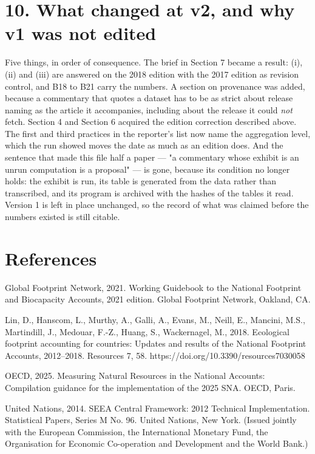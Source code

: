 \documentclass[11pt]{article}
\begin{document}
\section*{10. What changed at v2, and why v1 was not edited}\label{10-what-changed-at-v2-and-why-v1-was-not-edited}

Five things, in order of consequence. The brief in Section 7 became a result: (i), (ii) and (iii) are answered on the 2018 edition with the 2017 edition as revision control, and B18 to B21 carry the numbers. A section on provenance was added, because a commentary that quotes a dataset has to be as strict about release naming as the article it accompanies, including about the release it could \emph{not} fetch. Section 4 and Section 6 acquired the edition correction described above. The first and third practices in the reporter's list now name the aggregation level, which the run showed moves the date as much as an edition does. And the sentence that made this file half a paper --- "a commentary whose exhibit is an unrun computation is a proposal" --- is gone, because its condition no longer holds: the exhibit is run, its table is generated from the data rather than transcribed, and its program is archived with the hashes of the tables it read. Version 1 is left in place unchanged, so the record of what was claimed before the numbers existed is still citable.

\vspace{0.8em}

\section*{References}\label{references}

Global Footprint Network, 2021. Working Guidebook to the National Footprint and Biocapacity Accounts, 2021 edition. Global Footprint Network, Oakland, CA.

Lin, D., Hanscom, L., Murthy, A., Galli, A., Evans, M., Neill, E., Mancini, M.S., Martindill, J., Medouar, F.-Z., Huang, S., Wackernagel, M., 2018. Ecological footprint accounting for countries: Updates and results of the National Footprint Accounts, 2012--2018. Resources 7, 58. https://doi.org/10.3390/resources7030058

OECD, 2025. Measuring Natural Resources in the National Accounts: Compilation guidance for the implementation of the 2025 SNA. OECD, Paris.

United Nations, 2014. SEEA Central Framework: 2012 Technical Implementation. Statistical Papers, Series M No. 96. United Nations, New York. (Issued jointly with the European Commission, the International Monetary Fund, the Organisation for Economic Co-operation and Development and the World Bank.)
\end{document}

